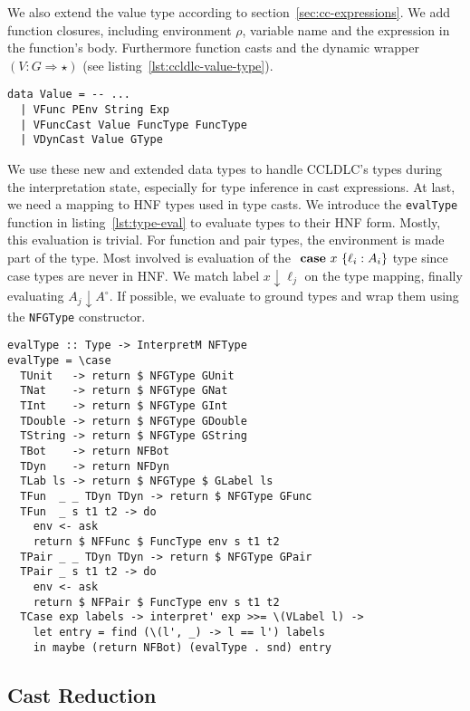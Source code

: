 We also extend the value type according to section~\ref{sec:cc-expressions}. We add function closures, including environment $\rho$, variable name and the expression in the function's body. Furthermore function casts and the dynamic wrapper $(V : G \Rightarrow \star)$ (see listing~\ref{lst:ccldlc-value-type}).

\begin{lstlisting}[float,
  label=lst:ccldlc-value-type,
  caption=Haskell: Value type extensions (\texttt{ProcessEnvironment.hs})]
data Value = -- ...
  | VFunc PEnv String Exp
  | VFuncCast Value FuncType FuncType
  | VDynCast Value GType
\end{lstlisting}

We use these new and extended data types to handle CCLDLC's types during the interpretation state, especially for type inference in cast expressions. At last, we need a mapping to HNF types used in type casts. We introduce the \texttt{evalType} function in listing~\ref{lst:type-eval} to evaluate types to their HNF form. Mostly, this evaluation is trivial. For function and pair types, the environment is made part of the type. Most involved is evaluation of the $\text{ \textbf{case} } x~\{\ell_i : A_i\}$ type since case types are never in HNF. We match label $x \downarrow \ell_j$ on the type mapping, finally evaluating $A_j \downarrow A^\circ$. If possible, we evaluate to ground types and wrap them using the \texttt{NFGType} constructor.

\begin{lstlisting}[float,
  caption=Haskell: Type evaluation (\texttt{Interpreter.hs}),
  label=lst:type-eval]
evalType :: Type -> InterpretM NFType
evalType = \case
  TUnit   -> return $ NFGType GUnit
  TNat    -> return $ NFGType GNat
  TInt    -> return $ NFGType GInt
  TDouble -> return $ NFGType GDouble
  TString -> return $ NFGType GString
  TBot    -> return NFBot
  TDyn    -> return NFDyn
  TLab ls -> return $ NFGType $ GLabel ls
  TFun  _ _ TDyn TDyn -> return $ NFGType GFunc
  TFun  _ s t1 t2 -> do
    env <- ask
    return $ NFFunc $ FuncType env s t1 t2
  TPair _ _ TDyn TDyn -> return $ NFGType GPair
  TPair _ s t1 t2 -> do
    env <- ask
    return $ NFPair $ FuncType env s t1 t2
  TCase exp labels -> interpret' exp >>= \(VLabel l) ->
    let entry = find (\(l', _) -> l == l') labels
    in maybe (return NFBot) (evalType . snd) entry
\end{lstlisting}

\subsection{Cast Reduction}

